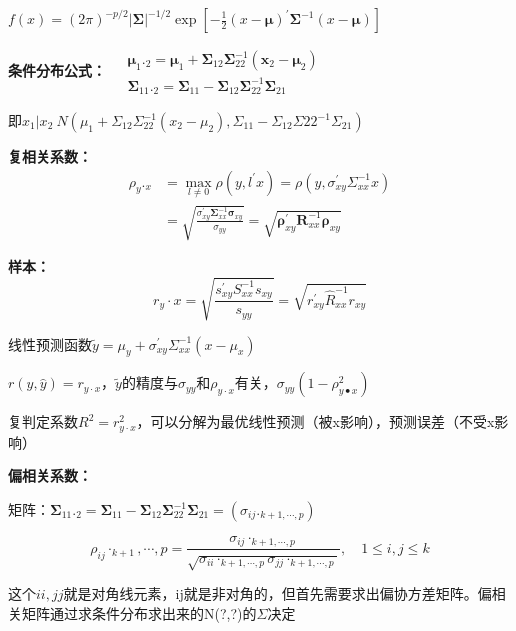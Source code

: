 \documentclass[10pt,a4paper]{ctexart} %
\begin{document}
\begin{multicols*}{3}
		$f\left(x\right)=\left(2\pi\right)^{-p/2}\left|\boldsymbol{\Sigma}\right|^{-1/2}\exp\left[-\frac{1}{2}\left(x-\boldsymbol{\mu}\right)^{\prime}\boldsymbol{\Sigma}^{-1}\left(x-\boldsymbol{\mu}\right)\right]$
		
		\textbf{条件分布公式：}
		$\begin{aligned}&\boldsymbol{\mu}_{1}._{2}=\boldsymbol{\mu}_{1}+\boldsymbol{\Sigma}_{12}\boldsymbol{\Sigma}_{22}^{-1}(\boldsymbol{x}_{2}-\boldsymbol{\mu}_{2})\\
			&\boldsymbol{\Sigma}_{11}._{2}=\boldsymbol{\Sigma}_{11}-\boldsymbol{\Sigma}_{12}\boldsymbol{\Sigma}_{22}^{-1}\boldsymbol{\Sigma}_{21}\end{aligned}$
		
		即$x_1|x_2 ~ N(\mu_1 + \Sigma_{12}\Sigma_{22}^{-1}(x_2-\mu_2),\Sigma_{11}-\Sigma_{12}\Sigma{22}^{-1}\Sigma_{21})$
		
		\textbf{复相关系数：}
		$$\begin{aligned}\rho_{y}._{x}&=\max_{l\neq0}\rho(y,l^{\prime}x)=\rho(y,\sigma_{xy}^{\prime}\Sigma_{xx}^{-1}x)\\&=\sqrt{\frac{\sigma_{xy}^{\prime}\boldsymbol{\Sigma}_{xx}^{-1}\boldsymbol{\sigma}_{xy}}{\sigma_{yy}}}=\sqrt{\boldsymbol{\rho}_{xy}^{\prime}\boldsymbol{R}_{xx}^{-1}\boldsymbol{\rho}_{xy}}\end{aligned}$$
		
		\textbf{样本：}
		$$r_{y}\cdot x=\sqrt{\frac{s_{xy}^{\prime}S_{xx}^{-1}s_{xy}}{s_{yy}}}=\sqrt{r_{xy}^{\prime}\hat{R}_{xx}^{-1}r_{xy}}$$
		
		线性预测函数$\tilde{y}=\mu_y+\sigma_{xy}^{\prime}\Sigma_{xx}^{-1}\left(x-\mu_x\right)$
		
		$r(y,\hat{y})=r_{y\cdot x}$，$\tilde{y}$的精度与$\sigma_{yy}$和$\rho_{y \cdot x}$有关，$\sigma_{yy}\left(1-\rho_{y\bullet x}^2\right)$
		
		复判定系数$R^2=r_{y\cdot x}^2$，可以分解为最优线性预测（被x影响），预测误差（不受x影响）
		
		\textbf{偏相关系数：}
		
		矩阵：$\boldsymbol{\Sigma}_{11}._{2}=\boldsymbol{\Sigma}_{11}-\boldsymbol{\Sigma}_{12}\boldsymbol{\Sigma}_{22}^{-1}\boldsymbol{\Sigma}_{21}=(\sigma_{ij}._{k+1,\cdots,p})$
		
		$$\rho_{ij}\cdot_{k+1},\cdots,p=\frac{\sigma_{ij}\cdot_{k+1,\cdots,p}}{\sqrt{\sigma_{ii}\cdot_{k+1,\cdots,p}\sigma_{jj}\cdot_{k+1,\cdots,p}}},\quad1\leqslant i,j\leqslant k$$
		
		这个$ii,jj$就是对角线元素，ij就是非对角的，但首先需要求出偏协方差矩阵。偏相关矩阵通过求条件分布求出来的N(?,?)的$\Sigma$决定
		

\end{multicols*}
\end{document}
